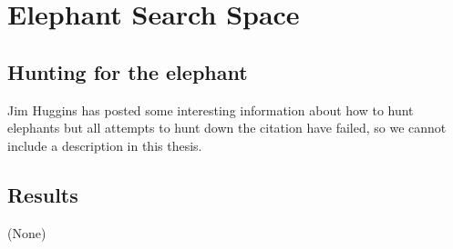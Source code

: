 \chapter{Elephant Search Space} 

\label{chapter:chapter3}

\section{Hunting for the elephant} 

Jim Huggins has posted some interesting information about how to hunt
elephants but all attempts to hunt down the citation have failed, so
we cannot include a description in this thesis.



\section{Results} 

(None) 

